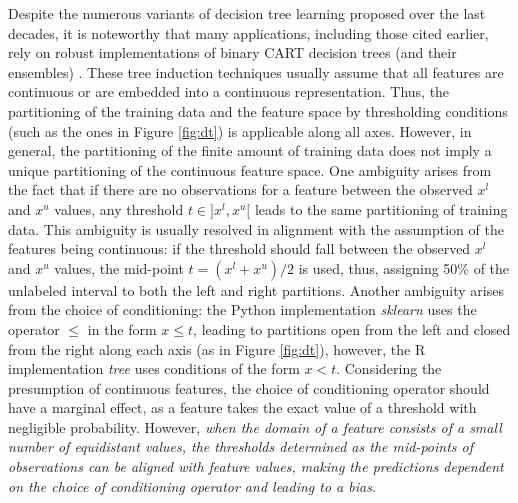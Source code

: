 \documentclass[sn-mathphys]{sn-jnl}%
\theoremstyle{thmstyleone}%
\theoremstyle{thmstyletwo}%
\theoremstyle{thmstylethree}%
\begin{document}
Despite the numerous variants of decision tree learning proposed over the last decades, it is noteworthy that many applications, including those cited earlier, rely on robust implementations of binary CART decision trees (and their ensembles) \citep{sklearn, tree, caret, xgboost, lightgbm}. These tree induction techniques usually assume that all features are continuous or are embedded into a continuous representation. Thus, the partitioning of the training data and the feature space by thresholding conditions (such as the ones in Figure \ref{fig:dt}) is applicable along all axes. However, in general, the partitioning of the finite amount of training data does not imply a unique partitioning of the continuous feature space. One ambiguity arises from the fact that if there are no observations for a feature between the observed $x^l$ and $x^u$ values, any threshold $t\in]x^l, x^u[$ leads to the same partitioning of training data. This ambiguity is usually resolved in alignment with the assumption of the features being continuous: if the threshold should fall between the observed $x^l$ and $x^u$ values, the mid-point $t=(x^l + x^u)/2$ is used, thus, assigning 50\% of the unlabeled interval to both the left and right partitions. Another ambiguity arises from the choice of conditioning: the Python implementation \emph{sklearn} \citep{sklearn} uses the operator $\leq$ in the form $x \leq t$, leading to partitions open from the left and closed from the right along each axis (as in Figure \ref{fig:dt}), however, the R implementation \emph{tree} \citep{tree} uses conditions of the form $x < t$. Considering the presumption of continuous features, the choice of conditioning operator should have a marginal effect, as a feature takes the exact value of a threshold with negligible probability. However, \emph{when the domain of a feature consists of a small number of equidistant values, the thresholds determined as the mid-points of observations can be aligned with feature values, making the predictions dependent on the choice of conditioning operator and leading to a bias}.
\end{document}
